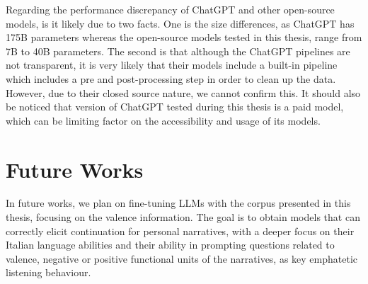 Regarding the performance discrepancy of ChatGPT and other open-source models, is it likely due to two facts. One is the size differences, as ChatGPT has 175B parameters \cite{chatgpt-parameters} whereas the open-source models tested in this thesis, range from 7B to 40B parameters.
The second is that although the ChatGPT pipelines are not transparent, it is very likely that their models include a built-in pipeline which includes a pre and post-processing step in order to clean up the data. However, due to their closed source nature, we cannot confirm this. It should also be noticed that version of ChatGPT tested during this thesis is a paid model, which can be limiting factor on the accessibility and usage of its models.


\section{Future Works}
In future works, we plan on fine-tuning LLMs with the corpus presented in this thesis, focusing on the valence information. The goal is to obtain models that can correctly elicit continuation for personal narratives, with a deeper focus on their Italian language abilities and their ability in prompting questions related to valence, negative or positive functional units of the narratives, as key emphatetic listening behaviour.
